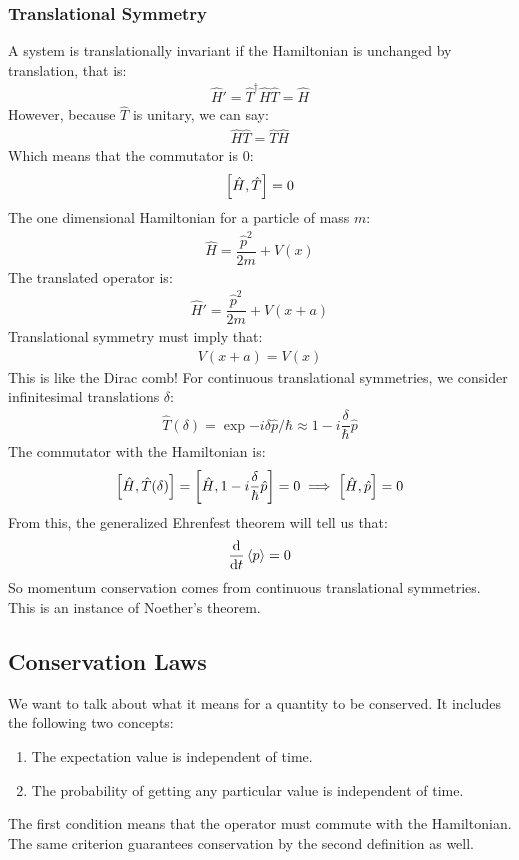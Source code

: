 \subsubsection{Translational Symmetry}
A system is translationally invariant if the Hamiltonian is unchanged by translation, that is:
\begin{align*}
  \hat{H}'=\hat{T}^\dag\hat{H}\hat{T}=\hat{H}
\end{align*}
However, because $\hat{T}$ is unitary, we can say:
\begin{align*}
  \hat{H}\hat{T}=\hat{T}\hat{H}
\end{align*}
Which means that the commutator is $0$:
\begin{align*}
  \comm{\hat{H}}{\hat{T}}=0
\end{align*}
The one dimensional Hamiltonian for a particle of mass $m$:
\begin{align*}
  \hat{H}=\dfrac{\hat{p}^2}{2m}+V(x)
\end{align*}
The translated operator is:
\begin{align*}
  \hat{H}'=\dfrac{\hat{p}^2}{2m}+V(x+a)
\end{align*}
Translational symmetry must imply that:
\begin{align*}
  V(x+a)=V(x)
\end{align*}
This is like the Dirac comb! For continuous translational symmetries, we consider infinitesimal translations $\delta$:
\begin{align*}
  \hat{T}(\delta)=\exp{-i\delta\hat{p}/\hbar}\approx 1-i\dfrac{\delta}{\hbar}\hat{p}
\end{align*}
The commutator with the Hamiltonian is:
\begin{align*}
  \comm{\hat{H}}{\hat{T}(\delta)}=\comm{\hat{H}}{1-i\dfrac{\delta}{\hbar}\hat{p}}=0
  \implies\comm{\hat{H}}{\hat{p}}=0
\end{align*}
From this, the generalized Ehrenfest theorem will tell us that:
\begin{align*}
  \dv{t}\ev{p}=0
\end{align*}
So momentum conservation comes from continuous translational symmetries. This is an instance of Noether's theorem. 
\subsection{Conservation Laws}
We want to talk about what it means for a quantity to be conserved. It includes the following two concepts:
\begin{enumerate}
\item The expectation value is independent of time.
\item The probability of getting any particular value is independent of time. 
\end{enumerate}
The first condition means that the operator must commute with the Hamiltonian. The same criterion guarantees conservation by the second definition as well. 
